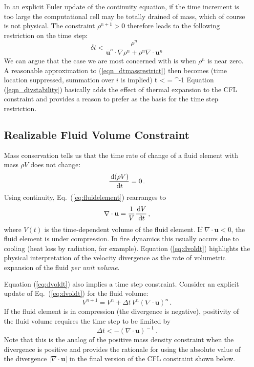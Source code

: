 In an explicit Euler update of the continuity equation, if the time increment is too large the computational cell may be totally drained of mass, which of course is not physical. The constraint $\rho^{n+1}>0$ therefore leads to the following restriction on the time step:
\begin{equation}
\label{eqn_dtmassrestrict}
\delta t < \frac{\rho^n}{\overline{\mathbf{u}}^n\cdot\nabla\rho^n + \rho^n \nabla\cdot\mathbf{u}^n}
\end{equation}
We can argue that the case we are most concerned with is when $\rho^n$ is near zero.  A reasonable approximation to (\ref{eqn_dtmassrestrict}) then becomes (time location suppressed, summation over $i$ is implied)
\be
\label{eqn_divstability}
\delta t <  = ^{-1}
\ee
Equation (\ref{eqn_divstability}) basically adds the effect of thermal expansion to the CFL constraint and provides a reason to prefer  as the basis for the time step restriction.

\subsection{Realizable Fluid Volume Constraint}

Mass conservation tells us that the time rate of change of a fluid element with mass $\rho V$ does not change:
\begin{equation}
\label{eq:fluidelement}
\frac{\,\mathrm{d} (\rho V)}{\,\mathrm{d} t} = 0 \,\mbox{.}
\end{equation}
Using continuity, Eq.~(\ref{eq:fluidelement}) rearranges to
\begin{equation}
\label{eq:dvoldt}
\nabla\cdot\mathbf{u} = \frac{1}{V} \frac{\,\mathrm{d} V}{\,\mathrm{d} t} \,\mbox{,}
\end{equation}
where $V(t)$ is the time-dependent volume of the fluid element.  If $\nabla\cdot\mathbf{u}<0$, the fluid element is under compression.  In fire dynamics this usually occurs due to cooling (heat loss by radiation, for example).  Equation (\ref{eq:dvoldt}) highlights the physical interpretation of the velocity divergence as the rate of volumetric expansion of the fluid \emph{per unit volume}.

Equation (\ref{eq:dvoldt}) also implies a time step constraint.  Consider an explicit update of Eq.~(\ref{eq:dvoldt}) for the fluid volume:
\begin{equation}
V^{n+1} = V^n + \Delta t \, V^n (\nabla\cdot\mathbf{u})^{\!n} \,\mbox{.}
\end{equation}
If the fluid element is in compression (the divergence is negative), positivity of the fluid volume requires the time step to be limited by
\begin{equation}
\label{eq:volumedtrestriction}
\Delta t < -(\nabla\cdot\mathbf{u})^{\!-1} \,\mbox{.}
\end{equation}
Note that this is the analog of the positive mass density constraint when the divergence is positive and provides the rationale for using the absolute value of the divergence $|\nabla\cdot\mathbf{u}|$ in the final version of the CFL constraint shown below.

